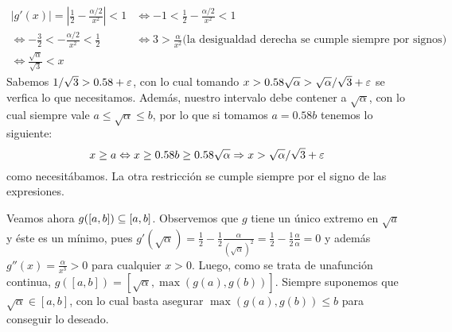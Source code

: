 $\begin{array}{rl}
	 |g'(x)| = |\frac{1}{2} - \frac{\alpha/2}{x^2}|  < 1 & \Leftrightarrow  -1 < \frac{1}{2} - \frac{\alpha/2}{x^2} < 1\nonumber \\
	\Leftrightarrow  -\frac{3}{2} <  - \frac{\alpha/2}{x^2}  < \frac{1}{2} & \Leftrightarrow 
		3 >  \frac{\alpha}{x^2}  \text{(la desigualdad derecha se cumple siempre por signos)} \nonumber \\
	\Leftrightarrow  \frac{\sqrt{\alpha}}{\sqrt{3}} < x \nonumber
\end{array}$\\
Sabemos $1/\sqrt{3} > 0.58 + \varepsilon$, con lo cual tomando $x > 0.58\sqrt{\alpha} > \sqrt{\alpha}/\sqrt{3} + \varepsilon$ se verfica lo que necesitamos. Además, nuestro intervalo debe contener a $\sqrt{\alpha}$, con lo cual siempre vale $a \leq \sqrt{\alpha} \leq b$, por lo que si tomamos $a = 0.58b$ tenemos lo siguiente:
$$x \geq a \Leftrightarrow x \geq 0.58b \geq 0.58\sqrt{\alpha} \Rightarrow x > \sqrt{\alpha}/\sqrt{3} + \varepsilon$$ 
como necesitábamos. La otra restricción se cumple siempre por el signo de las expresiones.

Veamos ahora $g([a,b]) \subseteq [a,b]$. Observemos que $g$ tiene un único extremo en $\sqrt{a}$ y éste es un mínimo, pues $g'(\sqrt{\alpha}) = \frac{1}{2} - \frac{1}{2}\frac{\alpha}{(\sqrt{\alpha})^2} = \frac{1}{2} - \frac{1}{2}\frac{\alpha}{\alpha} = 0$ y además $g''(x) = \frac{\alpha}{x^3} >0$ para cualquier $x>0$. Luego, como se trata de unafunción continua, $g([a,b]) = [\sqrt{\alpha}, \max(g(a), g(b))]$. Siempre suponemos que $\sqrt{\alpha}\in[a,b]$, con lo cual basta asegurar $\max(g(a), g(b))\leq b$ para conseguir lo deseado.

